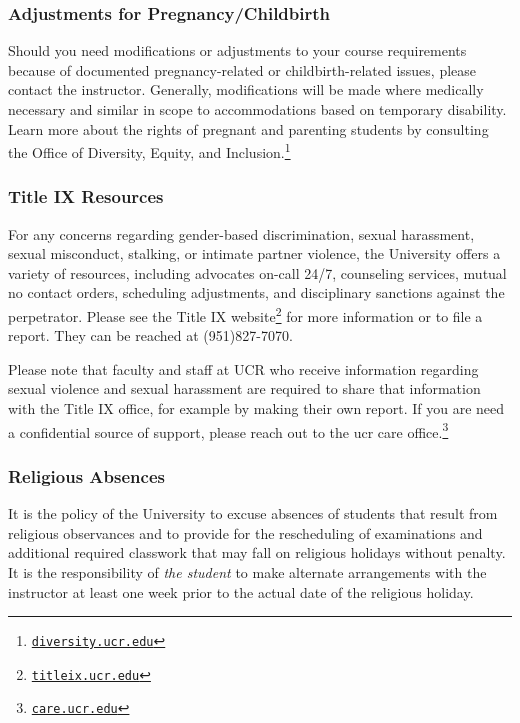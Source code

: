 \documentclass[12pt]{article}
\newcommand{\footlink}[1]{\footnote{\href{https://#1}{\texttt{#1}}}}
\newcommand{\UCR}{\acro{UCR}\xspace}
\newcommand\acro[1]{{\small {#1}}}
\numberwithin{equation}{section}    %
\begin{document}
\subsubsection{Adjustments for Pregnancy/Childbirth}

Should you need modifications or adjustments to your course requirements because of documented pregnancy-related or childbirth-related issues, please contact the instructor. Generally, modifications will be made where medically necessary and similar in scope to accommodations based on temporary disability.  Learn more about the rights of pregnant and parenting students by consulting the Office of Diversity, Equity, and Inclusion.\footlink{diversity.ucr.edu}

\subsubsection{Title IX Resources}

For any concerns regarding gender-based discrimination, sexual harassment, sexual misconduct, stalking, or intimate partner violence, the University offers a variety of resources, including advocates on-call 24/7, counseling services, mutual no contact orders, scheduling adjustments, and disciplinary sanctions against the perpetrator. Please see the Title IX website\footlink{titleix.ucr.edu} for more information or to file a report. They can be reached at (951)827-7070. 

Please note that faculty and staff at \UCR who receive information regarding sexual violence and sexual harassment are required to share that information with the Title IX office, for example by making their own report. If you are need a confidential source of support, please reach out to the \acro{ucr care} office.\footlink{care.ucr.edu}

\subsubsection{Religious Absences}

It is the policy of the University to excuse absences of students that result from religious observances and to provide for the rescheduling of examinations and additional required classwork that may fall on religious holidays without penalty. It is the responsibility of \emph{the student} to make alternate arrangements with the instructor at least one week prior to the actual date of the religious holiday.
\end{document}
